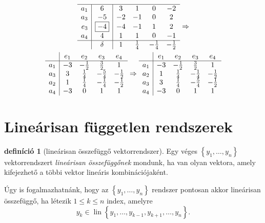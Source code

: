 \documentclass[a4paper, showtrims]{memoir}
\theoremstyle{plain}
\theoremstyle{remark}
\theoremstyle{definition}
\newtheorem{definition}[proposition]{definíció}
\DeclareMathOperator{\lin}{lin}
\begin{document}
\begin{multline*}
\begin{array}{r|c|cccc}
		\hline
		a_1 & 6          & 3   & 1           & 0            & -2           \\
		a_3 & -5         & -2  & -1          & 0            & 2            \\
		e_3 & \boxed{-4} & -4  & -1          & 1            & 2            \\
		a_4 & 4          & 1   & 1           & 0            & -1           \\
		\hline
		    & \delta     & 1   & \frac{1}{4} & -\frac{1}{4} & -\frac{1}{2}
	\end{array}\Rightarrow
	\\
	\begin{array}{r|cccc}
		    & e_1 & e_2          & e_3          & e_4          \\
		\hline
		a_1 & -3  & -\frac{1}{2} & \frac{3}{2}  & 1            \\
		a_3 & 3   & \frac{1}{4}  & -\frac{5}{4} & -\frac{1}{2} \\
		a_2 & 1   & \frac{1}{4}  & -\frac{1}{4} & -\frac{1}{2} \\
		a_4 & -3  & 0            & 1            & 1
	\end{array}\Rightarrow
	\begin{array}{r|cccc}
		    & e_1 & e_2          & e_3          & e_4          \\
		\hline
		a_1 & -3  & -\frac{1}{2} & \frac{3}{2}  & 1            \\
		a_2 & 1   & \frac{1}{4}  & -\frac{1}{4} & -\frac{1}{2} \\
		a_3 & 3   & \frac{1}{4}  & -\frac{5}{4} & -\frac{1}{2} \\
		a_4 & -3  & 0            & 1            & 1
	\end{array}
\end{multline*}

\section{Lineárisan független rendszerek}
\begin{definition}[lineárisan összefüggő vektorrendszer]
	Egy véges $\left\{ y_1,\ldots,y_n \right\}$ vektorrendszert \emph{lineárisan összefüggőnek}
	mondunk, ha van olyan vektora, amely kifejezhető a többi vektor lineáris kombinációjaként.
\end{definition}
Úgy is fogalmazhatnánk, hogy az $\left\{ y_1,\ldots,y_n \right\}$ rendszer pontosan akkor
lineárisan összefüggő, ha létezik $1\leq k\leq n$ index, amelyre
\[
	y_k\in\lin\left\{ y_1,\ldots,y_{k-1},y_{k+1},\ldots,y_n \right\}.
\]
\end{document}

